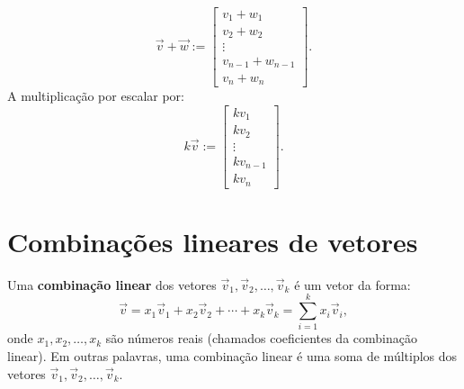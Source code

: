 \begin{equation}
\vec{v} + \vec{w} :=
\left[
  \begin{array}{c}
    v_1 + w_1 \\
    v_2 + w_2 \\
    \vdots \\
    v_{n-1} + w_{n-1} \\
    v_n + w_n
  \end{array}
\right].
\end{equation} A multiplicação por escalar por:
\begin{equation}
k \vec{v} :=
\left[
  \begin{array}{c}
    k v_1 \\
    k v_2 \\
    \vdots \\
    k v_{n-1} \\
    k v_n
  \end{array}
\right].
\end{equation}








\section{Combinações lineares de vetores}

Uma \textbf{combinação linear} dos vetores $\vec{v}_1, \vec{v}_2, \dots, \vec{v}_k$ é um vetor da forma:
\begin{equation}
\vec{v} = x_1 \vec{v}_1 + x_2 \vec{v}_2 + \cdots + x_k \vec{v}_k = \sum_{i=1}^k x_i \vec{v}_i,
\end{equation} onde $x_1, x_2, \dots, x_k$ são números reais (chamados coeficientes da combinação linear). Em outras palavras, uma combinação linear é uma soma de múltiplos dos vetores $\vec{v}_1, \vec{v}_2, \dots, \vec{v}_k$.


